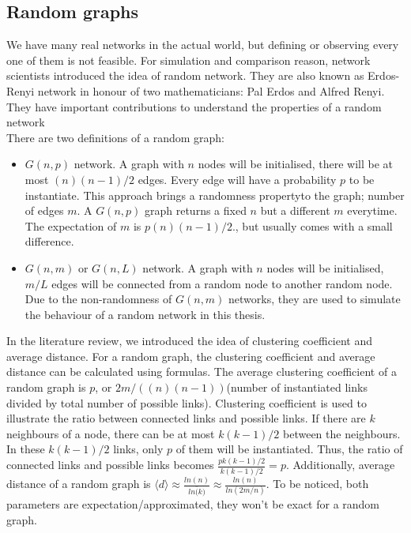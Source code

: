 \documentclass[12pt]{article}
\begin{document}
\subsection{Random graphs}
We have many real networks in the actual world, but defining or observing every one of them is not feasible. For simulation and comparison reason, network scientists introduced the idea of random network. They are also known as Erdos-Renyi network in honour of two mathematicians: Pal Erdos and Alfred Renyi. They have important contributions to understand the properties of a random network\cite{barabási2016network}\\
\noindent
There are two definitions of a random graph:
\begin{itemize}
    \item $G(n,p)$ network. A graph with $n$ nodes will be initialised, there will be at most $(n)(n-1)/2$ edges. Every edge will have a probability $p$ to be instantiate. This approach brings a randomness propertyto the graph; number of edges $m$. A $G(n,p)$ graph returns a fixed $n$ but a different $m$ everytime. The expectation of $m$ is $p(n)(n-1)/2$., but usually comes with a small difference.
    \item $G(n,m)$ or $G(n,L)$ network. A graph with $n$ nodes will be initialised, $m/L$ edges will be connected from a random node to another random node. Due to the non-randomness of $G(n,m)$ networks, they are used to simulate the behaviour of a random network in this thesis.
\end{itemize}

In the literature review, we introduced the idea of clustering coefficient and average distance. For a random graph, the clustering coefficient and average distance can be calculated using formulas.\cite{barabási2016network} The average clustering coefficient of a random graph is $p$, or $2m/((n)(n-1))$(number of instantiated links divided by total number of possible links). Clustering coefficient is used to illustrate the ratio between connected links and possible links. If there are $k$ neighbours of a node, there can be at most $k(k-1)/2$ between the neighbours. In these $k(k-1)/2$ links, only $p$ of them will be instantiated. Thus, the ratio of connected links and possible links becomes $\frac{pk(k-1)/2}{k(k-1)/2}=p$. Additionally, average distance of a random graph is $\langle d\rangle \approx \frac{ln(n)}{ln\bar (k)}\approx \frac{ln(n)}{ln(2m/n)}$. To be noticed, both parameters are expectation/approximated, they won't be exact for a random graph.
\end{document}
